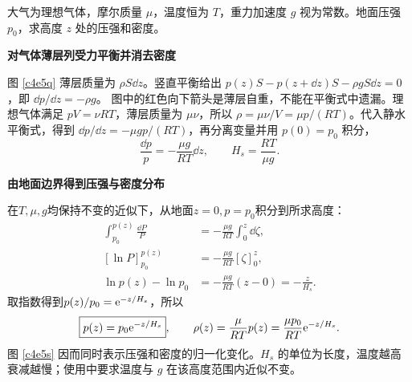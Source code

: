 \begin{question}
\begin{example}[等温大气压强]
大气为理想气体，摩尔质量 $\mu$，温度恒为 $T$，重力加速度 $g$ 视为常数。地面压强 $p_0$，求高度 $z$ 处的压强和密度。
\end{example}
\end{question}
\begin{solution}\textbf{对气体薄层列受力平衡并消去密度}\par\nobreak
图 \ref{c4e5q} 薄层质量为 $\rho S\dd z$。竖直平衡给出
$p(z)S-p(z+\dd z)S-\rho gS\dd z=0$，即 $\dd p/\dd z=-\rho g$。
图中的红色向下箭头是薄层自重，不能在平衡式中遗漏。理想气体满足 $pV=\nu RT$，薄层质量为 $\mu\nu$，所以 $\rho=\mu\nu/V=\mu p/(RT)$。代入静水平衡式，得到 $\dd p/\dd z=-\mu gp/(RT)$，再分离变量并用 $p(0)=p_0$ 积分，
\[
 \frac{\dd p}{p}=-\frac{\mu g}{RT}\dd z,
 \qquad H_s=\frac{RT}{\mu g}.
\]



\par\medskip{}\noindent\textbf{由地面边界得到压强与密度分布}\par\nobreak
在$T,\mu,g$均保持不变的近似下，从地面$z=0,p=p_0$积分到所求高度：
\begin{align*}
\int_{p_0}^{p(z)}\frac{\dd P}{P}
&=-\frac{\mu g}{RT}\int_0^z\dd\zeta,\\
[\ln P]_{p_0}^{p(z)}&=-\frac{\mu g}{RT}[\zeta]_0^z,\\
\ln p(z)-\ln p_0&=-\frac{\mu g}{RT}(z-0)=-\frac z{H_s}.
\end{align*}
取指数得到$p(z)/p_0=\mathrm e^{-z/H_s}$，所以
\[
\boxed{p(z)=p_0\mathrm e^{-z/H_s}},\qquad
\rho(z)=\frac{\mu}{RT}p(z)=\frac{\mu p_0}{RT}\mathrm e^{-z/H_s}.
\]
图 \ref{c4e5s} 因而同时表示压强和密度的归一化变化。$H_s$ 的单位为长度，温度越高衰减越慢；使用中要求温度与 $g$ 在该高度范围内近似不变。
\end{solution}

